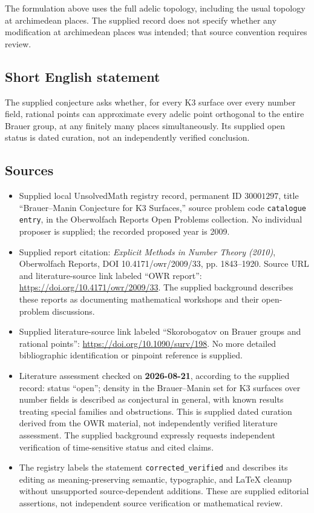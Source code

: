\documentclass[11pt]{article}
\begin{document}
The formulation above uses the full adelic topology, including the usual topology at archimedean places. The supplied record does not specify whether any modification at archimedean places was intended; that source convention requires review.
\subsection{Short English statement}
The supplied conjecture asks whether, for every K3 surface over every number field, rational points can approximate every adelic point orthogonal to the entire Brauer group, at any finitely many places simultaneously. Its supplied open status is dated curation, not an independently verified conclusion.
\subsection{Sources}
\begin{itemize}
\item Supplied local UnsolvedMath registry record, permanent ID \(30001297\), title ``Brauer--Manin Conjecture for K3 Surfaces,'' source problem code \texttt{catalogue entry}, in the Oberwolfach Reports Open Problems collection. No individual proposer is supplied; the recorded proposed year is 2009.
\item Supplied report citation: \emph{Explicit Methods in Number Theory (2010)}, Oberwolfach Reports, DOI 10.4171/owr/2009/33, pp. 1843--1920. Source URL and literature-source link labeled ``OWR report'': \url{https://doi.org/10.4171/owr/2009/33}. The supplied background describes these reports as documenting mathematical workshops and their open-problem discussions.
\item Supplied literature-source link labeled ``Skorobogatov on Brauer groups and rational points'': \url{https://doi.org/10.1090/surv/198}. No more detailed bibliographic identification or pinpoint reference is supplied.
\item Literature assessment checked on \textbf{2026-08-21}, according to the supplied record: status ``open''; density in the Brauer--Manin set for K3 surfaces over number fields is described as conjectural in general, with known results treating special families and obstructions. This is supplied dated curation derived from the OWR material, not independently verified literature assessment. The supplied background expressly requests independent verification of time-sensitive status and cited claims.
\item The registry labels the statement \texttt{corrected\_verified} and describes its editing as meaning-preserving semantic, typographic, and LaTeX cleanup without unsupported source-dependent additions. These are supplied editorial assertions, not independent source verification or mathematical review.
\end{itemize}
\end{document}
